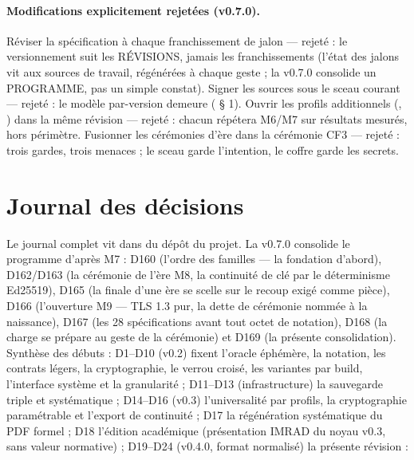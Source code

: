 \paragraph{Modifications explicitement rejetées (v0.7.0).} Réviser la spécification
à chaque franchissement de jalon — rejeté : le versionnement suit les RÉVISIONS,
jamais les franchissements (l'état des jalons vit aux sources de travail,
régénérées à chaque geste ; la v0.7.0 consolide un PROGRAMME, pas un simple
constat). Signer les sources  sous le sceau courant — rejeté : le
modèle par-version demeure ( § 1). Ouvrir les profils
additionnels (, ) dans la même
révision — rejeté : chacun répétera M6/M7 sur résultats mesurés, hors périmètre.
Fusionner les cérémonies d'ère dans la cérémonie CF3 — rejeté : trois gardes,
trois menaces ; le sceau garde l'intention, le coffre garde les secrets.

\section{Journal des décisions}\label{sec:decisions}

Le journal complet vit dans  du dépôt du projet. La
v0.7.0 consolide le programme d'après M7 : D160 (l'ordre des familles — la
fondation d'abord), D162/D163 (la cérémonie de l'ère M8, la continuité de clé par
le déterminisme Ed25519), D165 (la finale d'une ère se scelle sur le recoup
exigé comme pièce), D166 (l'ouverture M9 — TLS 1.3 pur, la dette de cérémonie
nommée à la naissance), D167 (les 28 spécifications avant tout octet de
notation), D168 (la charge se prépare au geste de la cérémonie) et D169 (la
présente consolidation). Synthèse des débuts :
D1–D10 (v0.2) fixent l'oracle éphémère, la notation, les contrats légers, la
cryptographie, le verrou croisé, les variantes par build, l'interface système et la
granularité ; D11–D13 (infrastructure) la sauvegarde triple et systématique ; D14–D16
(v0.3) l'universalité par profils, la cryptographie paramétrable et l'export de
continuité ; D17 la régénération systématique du PDF formel ; D18 l'édition académique
(présentation IMRAD du noyau v0.3, sans valeur normative) ; D19–D24 (v0.4.0, format
normalisé) la présente révision :

